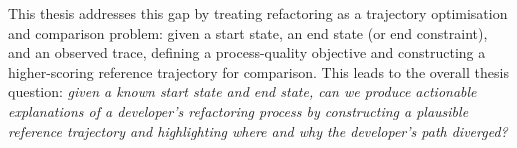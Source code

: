 This thesis addresses this gap by treating refactoring as a trajectory optimisation and comparison problem: given a start state, an end state (or end constraint), and an observed trace, defining a process-quality objective and constructing a higher-scoring reference trajectory for comparison. This leads to the overall thesis question: \emph{given a known start state and end state, can we produce actionable explanations of a developer’s refactoring process by constructing a plausible reference trajectory and highlighting where and why the developer’s path diverged?}

